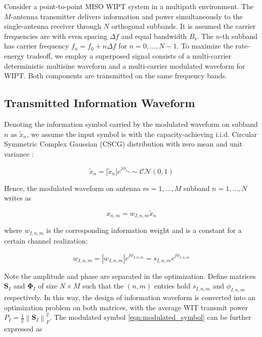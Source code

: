 Consider a point-to-point MISO WIPT system in a multipath environment. The $M$-antenna transmitter delivers information and power simultaneously to the single-antenna receiver through $N$ orthogonal subbands. It is assumed the carrier frequencies are with even spacing $\Delta f$ and equal bandwidth ${B_{\text{s}}}$. The $n$-th subband has carrier frequency ${f_n} = {f_0} + n\Delta f$ for $n = 0, \ldots ,N - 1$. To maximize the rate-energy tradeoff, we employ a superposed signal consists of a multi-carrier deterministic multisine waveform and a multi-carrier modulated waveform for WIPT. Both components are transmitted on the same frequency bands.



\subsection{Transmitted Information Waveform}\label{sec:transmitted-information-waveform}
Denoting the information symbol carried by the modulated waveform on subband $n$ as ${{\tilde x}_n}$, we assume the input symbol is with the capacity-achieving i.i.d. Circular Symmetric Complex Gaussian (CSCG) distribution with zero mean and unit variance \cite{Varasteh2017a}:

\begin{equation}\label{eqn:unmodulated_symbol}
  {{\tilde x}_n} = \left| {{{\tilde x}_n}} \right|{e^{j{\phi _{{{\tilde x}_n}}}}}\sim\mathcal{C}\mathcal{N}(0,1)
\end{equation}

Hence, the modulated waveform on antenna $m = 1, \ldots ,M$ subband $n = 1, \ldots ,N$ writes as

\begin{equation}\label{eqn:modulated_symbol}
  {x_{n,m}} = {w_{I,n,m}}{{\tilde x}_n}
\end{equation}

where ${w_{I,n,m}}$ is the corresponding information weight and is a constant for a certain channel realization:

\begin{equation}\label{eqn:weight_information}
  {w_{I,n,m}} = \left| {{w_{I,n,m}}} \right|{e^{j{\phi _{I,n,m}}}} = {s_{I,n,m}}{e^{j{\phi _{I,n,m}}}}
\end{equation}

Note the amplitude and phase are separated in the optimization. Define matrices ${{\mathbf{S}}_I}$ and ${{\mathbf{\Phi }}_I}$ of size $N \times M$ such that the $(n,m)$ entries hold ${s_{I,n,m}}$ and ${\phi _{I,n,m}}$ respectively. In this way, the design of information waveform is converted into an optimization problem on both matrices, with the average WIT transmit power ${P_I} = \frac{1}{2}\left\| {{{\mathbf{S}}_I}} \right\|_F^2$. The modulated symbol \eqref{eqn:modulated_symbol} can be further expressed as

